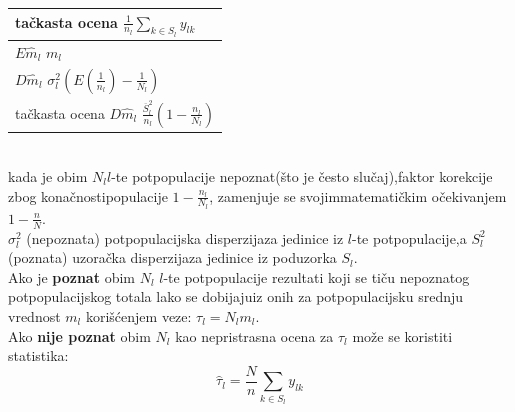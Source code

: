 \documentclass[10pt,a4paper,]{article}
\begin{document}
\begin{tabular}{p{7cm}}
tačkasta ocena \hspace{0.5cm} $\frac{1}{n_l}\sum_{k \in S_l}y_{lk}$ \\
\hline
$E\hat{m}_l$    \hspace{2cm}  $m_l$\\
\hline
$D\hat{m}_l$    \hspace{2cm}   $\sigma_l^2\left(E\left(\frac{1}{n_l}\right) - \frac{1}{N_l}\right)$\\
\hline
tačkasta ocena $D\hat{m}_l$  \hspace{0.5cm} 
$\frac{\overline{S}_l^2}{n_l}\left(1 - \frac{n_l}{N_l}\right)$\\
\hline
\end{tabular}
\\[0.2cm]
kada je obim $N_l l$-te potpopulacije nepoznat(što je često slučaj),faktor korekcije zbog konačnostipopulacije $1 - \frac{n_l}{N_l}$, zamenjuje se svojimmatematičkim očekivanjem 
$1- \frac{n}{N}$.
\\

$\sigma_{l}^2$ (nepoznata) potpopulacijska disperzijaza jedinice iz $l$-te potpopulacije,a $S_l^2$ (poznata) uzoračka disperzijaza jedinice iz poduzorka $S_l$.
\\

Ako je \textbf{poznat} obim \textbf{$N_l$} $l$-te potpopulacije rezultati koji se tiču nepoznatog potpopulacijskog 
totala lako se dobijajuiz onih za potpopulacijsku srednju vrednost $m_l$ korišćenjem veze: 
$\tau_l = N_lm_l$.
\\
Ako \textbf{nije poznat} obim $N_l$ kao nepristrasna ocena za 
$\tau_l$ može se koristiti statistika:
$$\hat{\tau}_l = \frac{N}{n}\sum_{k \in S_l}y_{lk}$$
\end{document}
